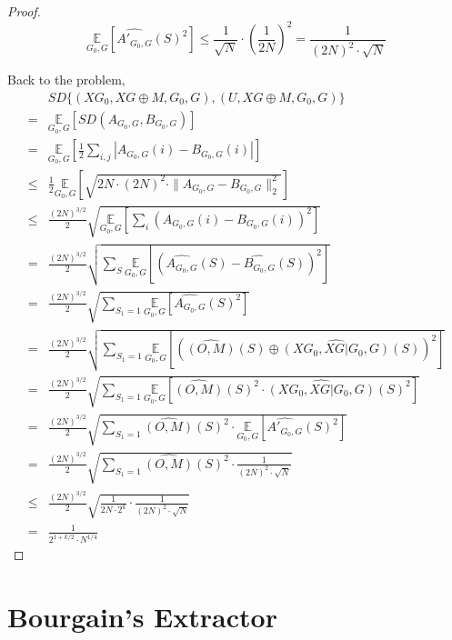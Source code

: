 \begin{proof}
$$\underset{G_0, G} {\mathbb{E}} 
	[\widehat{A'_{G_0,G}}(S)^2] \leq \frac{1}{\sqrt{N}} \cdot (\frac{1}{2N})^2 
	= \frac{1}{(2N)^2 \cdot \sqrt{N}}$$

Back to the problem,
\begin{align*}
& SD \{ (XG_0, XG \oplus M, G_0, G), (U, XG \oplus M, G_0, G) \} \\
= & \underset{G_0, G} {\mathbb{E}} \left[
	SD (A_{G_0,G},B_{G_0,G}) \right] \\
= & \underset{G_0, G} {\mathbb{E}} \left[
	\frac{1}{2} \sum\limits_{i,j} | A_{G_0,G}(i)- B_{G_0,G} (i)| \right] \\
\leq & \frac{1}{2} \underset{G_0, G} {\mathbb{E}} \left[ \sqrt{
	2N \cdot (2N)^2 \cdot \| A_{G_0,G} - B_{G_0,G} \|_2^2 }  \right] \\	
\leq & \frac{(2N)^{3/2}}{2} \sqrt{ \underset{G_0, G} {\mathbb{E}} \left[ 
	\sum\limits_{i} (A_{G_0,G}(i) - B_{G_0,G}(i) )^2 \right] } \\
= & \frac{(2N)^{3/2}}{2} \sqrt{
	\sum\limits_{S} \underset{G_0, G} {\mathbb{E}} \left[  
		(\widehat{A_{G_0,G}}(S) -
	     \widehat{B_{G_0,G}} (S) )^2 \right] }\\	
= & \frac{(2N)^{3/2}}{2} \sqrt{
	\sum\limits_{S_1 = 1} \underset{G_0, G} {\mathbb{E}} \left[  
		\widehat{A_{G_0,G}}(S)^2 \right] } \\
= & \frac{(2N)^{3/2}}{2} \sqrt{
	\sum\limits_{S_1 = 1} \underset{G_0, G} {\mathbb{E}} \left[  
		(\widehat{(O, M)}(S) \oplus
		\widehat{(XG_0, XG |G_0, G)}(S))^2 \right] } \\		
= & \frac{(2N)^{3/2}}{2} \sqrt{
	\sum\limits_{S_1 = 1} \underset{G_0, G} {\mathbb{E}} \left[  
		\widehat{(O, M)}(S)^2 \cdot 
		\widehat{(XG_0, XG |G_0, G)}(S)^2 \right] } \\
=& \frac{(2N)^{3/2}}{2} \sqrt{
	\sum\limits_{S_1 = 1} \widehat{(O, M)}(S)^2 \cdot 
		\underset{G_0, G} {\mathbb{E}} \left[  
		\widehat{A'_{G_0,G}}(S)^2 \right] } \\	
=& \frac{(2N)^{3/2}}{2} \sqrt{
	\sum\limits_{S_1 = 1} \widehat{(O, M)}(S)^2 \cdot 
		\frac{1} {(2N)^2 \cdot \sqrt{N}} }	\\
\leq &	\frac{(2N)^{3/2}}{2} \sqrt{
	\frac{1}{2N \cdot 2^k} \cdot 
		\frac{1} {(2N)^2 \cdot \sqrt{N}} }\\
= & \frac{1}{2^{1+k/2} \cdot N^{1/4}}						     		                                 
\end{align*}
\end{proof}

\chapter{Bourgain's Extractor}

